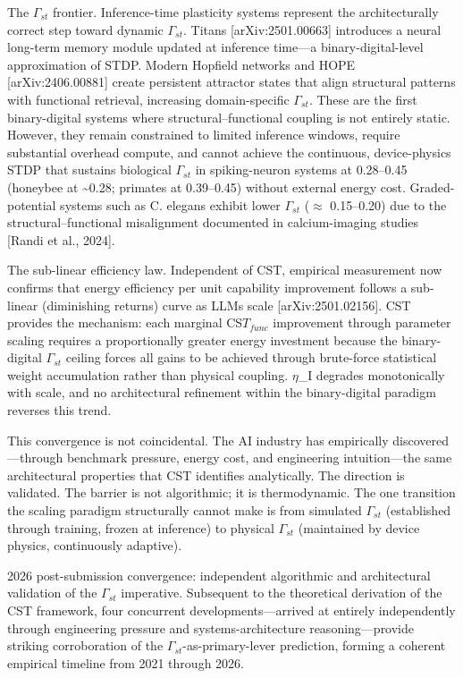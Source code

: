 \documentclass[a4paper,12pt]{article}
\begin{document}
The $\Gamma_{st}$ frontier. Inference-time plasticity systems represent the architecturally correct step toward dynamic $\Gamma_{st}$. Titans [arXiv:2501.00663] introduces a neural long-term memory module updated at inference time---a binary-digital-level approximation of STDP. Modern Hopfield networks and HOPE [arXiv:2406.00881] create persistent attractor states that align structural patterns with functional retrieval, increasing domain-specific $\Gamma_{st}$. These are the first binary-digital systems where structural--functional coupling is not entirely static. However, they remain constrained to limited inference windows, require substantial overhead compute, and cannot achieve the continuous, device-physics STDP that sustains biological $\Gamma_{st}$ in spiking-neuron systems at 0.28--0.45 (honeybee at \textasciitilde{}0.28; primates at 0.39--0.45) without external energy cost. Graded-potential systems such as C. elegans exhibit lower $\Gamma_{st}$ ($\approx$ 0.15--0.20) due to the structural--functional misalignment documented in calcium-imaging studies [Randi et al., 2024].


The sub-linear efficiency law. Independent of CST, empirical measurement now confirms that energy efficiency per unit capability improvement follows a sub-linear (diminishing returns) curve as LLMs scale [arXiv:2501.02156]. CST provides the mechanism: each marginal CS$T_{func}$ improvement through parameter scaling requires a proportionally greater energy investment because the binary-digital $\Gamma_{st}$ ceiling forces all gains to be achieved through brute-force statistical weight accumulation rather than physical coupling. $\eta$_I degrades monotonically with scale, and no architectural refinement within the binary-digital paradigm reverses this trend.


This convergence is not coincidental. The AI industry has empirically discovered---through benchmark pressure, energy cost, and engineering intuition---the same architectural properties that CST identifies analytically. The direction is validated. The barrier is not algorithmic; it is thermodynamic. The one transition the scaling paradigm structurally cannot make is from simulated $\Gamma_{st}$ (established through training, frozen at inference) to physical $\Gamma_{st}$ (maintained by device physics, continuously adaptive).


2026 post-submission convergence: independent algorithmic and architectural validation of the $\Gamma_{st}$ imperative. Subsequent to the theoretical derivation of the CST framework, four concurrent developments---arrived at entirely independently through engineering pressure and systems-architecture reasoning---provide striking corroboration of the $\Gamma_{st}$-as-primary-lever prediction, forming a coherent empirical timeline from 2021 through 2026.
\end{document}
